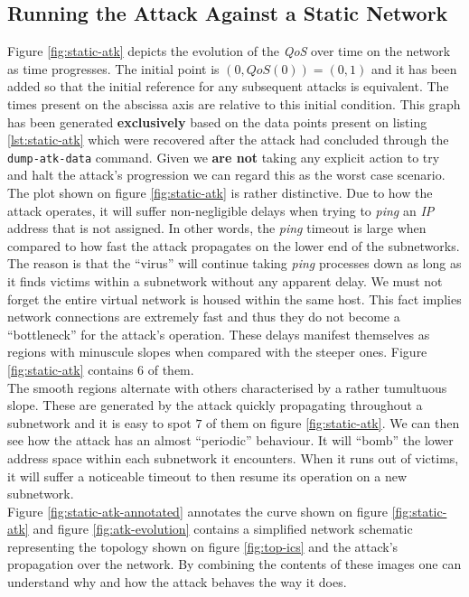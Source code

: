         \subsection{Running the Attack Against a Static Network}
            Figure \ref{fig:static-atk} depicts the evolution of the \textit{QoS} over time on the network as time progresses. The initial point is $(0, QoS(0)) = (0, 1)$ and it has been added so that the initial reference for any subsequent attacks is equivalent. The times present on the abscissa axis are relative to this initial condition. This graph has been generated \textbf{exclusively} based on the data points present on listing \ref{lst:static-atk} which were recovered after the attack had concluded through the \texttt{dump-atk-data} command. Given we \textbf{are not} taking any explicit action to try and halt the attack's progression we can regard this as the worst case scenario.\\

            The plot shown on figure \ref{fig:static-atk} is rather distinctive. Due to how the attack operates, it will suffer non-negligible delays when trying to \textit{ping} an \textit{IP} address that is not assigned. In other words, the \textit{ping} timeout is large when compared to how fast the attack propagates on the lower end of the subnetworks. The reason is that the ``virus'' will continue taking \textit{ping} processes down as long as it finds victims within a subnetwork without any apparent delay. We must not forget the entire virtual network is housed within the same host. This fact implies network connections are extremely fast and thus they do not become a ``bottleneck'' for the attack's operation. These delays manifest themselves as regions with minuscule slopes when compared with the steeper ones. Figure \ref{fig:static-atk} contains $6$ of them.\\

            The smooth regions alternate with others characterised by a rather tumultuous slope. These are generated by the attack quickly propagating throughout a subnetwork and it is easy to spot $7$ of them on figure \ref{fig:static-atk}. We can then see how the attack has an almost ``periodic'' behaviour. It will ``bomb'' the lower address space within each subnetwork it encounters. When it runs out of victims, it will suffer a noticeable timeout to then resume its operation on a new subnetwork.\\

            Figure \ref{fig:static-atk-annotated} annotates the curve shown on figure \ref{fig:static-atk} and figure \ref{fig:atk-evolution} contains a simplified network schematic representing the topology shown on figure \ref{fig:top-ics} and the attack's propagation over the network. By combining the contents of these images one can understand why and how the attack behaves the way it does.\\


